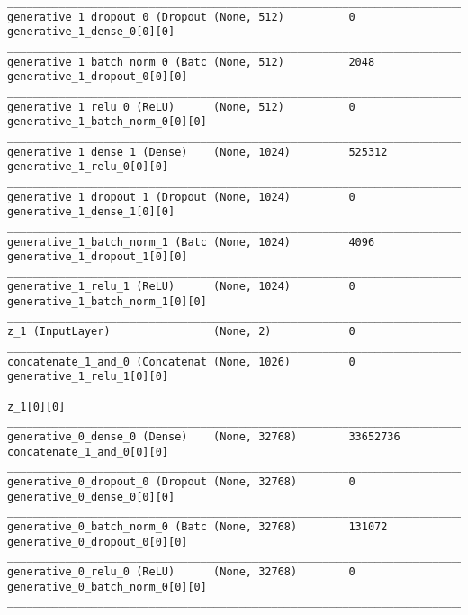 \begin{lstlisting}[caption={CelebA-\ac{VLAE} Decoder},captionpos=b,basicstyle=\tiny, label={lst:celeba-vlae-decoder}]
__________________________________________________________________________________________________
generative_1_dropout_0 (Dropout (None, 512)          0           generative_1_dense_0[0][0]
__________________________________________________________________________________________________
generative_1_batch_norm_0 (Batc (None, 512)          2048        generative_1_dropout_0[0][0]
__________________________________________________________________________________________________
generative_1_relu_0 (ReLU)      (None, 512)          0           generative_1_batch_norm_0[0][0]
__________________________________________________________________________________________________
generative_1_dense_1 (Dense)    (None, 1024)         525312      generative_1_relu_0[0][0]
__________________________________________________________________________________________________
generative_1_dropout_1 (Dropout (None, 1024)         0           generative_1_dense_1[0][0]
__________________________________________________________________________________________________
generative_1_batch_norm_1 (Batc (None, 1024)         4096        generative_1_dropout_1[0][0]
__________________________________________________________________________________________________
generative_1_relu_1 (ReLU)      (None, 1024)         0           generative_1_batch_norm_1[0][0]
__________________________________________________________________________________________________
z_1 (InputLayer)                (None, 2)            0
__________________________________________________________________________________________________
concatenate_1_and_0 (Concatenat (None, 1026)         0           generative_1_relu_1[0][0]
                                                                 z_1[0][0]
__________________________________________________________________________________________________
generative_0_dense_0 (Dense)    (None, 32768)        33652736    concatenate_1_and_0[0][0]
__________________________________________________________________________________________________
generative_0_dropout_0 (Dropout (None, 32768)        0           generative_0_dense_0[0][0]
__________________________________________________________________________________________________
generative_0_batch_norm_0 (Batc (None, 32768)        131072      generative_0_dropout_0[0][0]
__________________________________________________________________________________________________
generative_0_relu_0 (ReLU)      (None, 32768)        0           generative_0_batch_norm_0[0][0]
__________________________________________________________________________________________________

\end{lstlisting}

